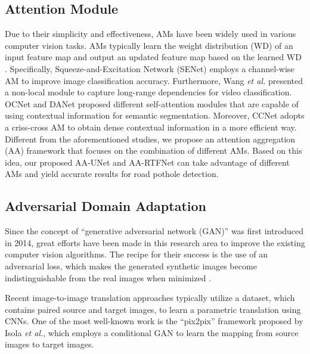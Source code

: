 \documentclass[runningheads]{llncs}
\newcommand{\etal}{\textit{et al.}}
\begin{document}
\subsection{Attention Module}
\label{sec.attention_module}
Due to their simplicity and effectiveness, AMs have been widely used in various computer vision tasks. AMs typically learn the weight distribution (WD) of an input feature map and output an updated feature map based on the learned WD \cite{vaswani2017attention}. Specifically, Squeeze-and-Excitation Network (SENet) \cite{hu2018squeeze} employs a channel-wise AM to improve image classification accuracy. Furthermore, Wang {\etal} \cite{wang2018non} presented a non-local module to capture long-range dependencies for video classification. OCNet \cite{yuan2018ocnet} and DANet \cite{fu2019dual} proposed different self-attention modules that are capable of using contextual information for semantic segmentation. Moreover, CCNet \cite{huang2019ccnet} adopts a criss-cross AM to obtain dense contextual information in a more efficient way. Different from the aforementioned studies, we propose an attention aggregation (AA) framework that focuses on the combination of different AMs. Based on this idea, our proposed AA-UNet and AA-RTFNet can take advantage of different AMs and yield accurate results for road pothole detection.

\subsection{Adversarial Domain Adaptation}
Since the concept of ``generative adversarial network (GAN)'' \cite{goodfellow2014generative} was first introduced in 2014, great efforts have been made in this research area to improve the existing computer vision algorithms. The recipe for their success is the use of an adversarial loss, {which makes the generated synthetic images become indistinguishable from the real images when minimized \cite{zhu2017unpaired}.}

Recent image-to-image translation approaches typically utilize a dataset,  which contains paired source and target images, to learn a parametric translation using CNNs. One of the most well-known work is the ``pix2pix'' framework \cite{isola2017image} proposed by Isola {\etal}, which employs a conditional GAN to learn the mapping from source images to target images.
\end{document}
